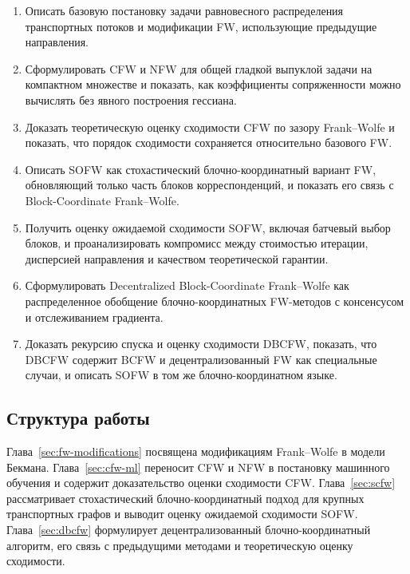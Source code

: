 \begin{enumerate}
    \item Описать базовую постановку задачи равновесного распределения транспортных потоков и модификации FW, использующие предыдущие направления.
    \item Сформулировать CFW и NFW для общей гладкой выпуклой задачи на компактном множестве и показать, как коэффициенты сопряженности можно вычислять без явного построения гессиана.
    \item Доказать теоретическую оценку сходимости CFW по зазору Frank--Wolfe и показать, что порядок сходимости сохраняется относительно базового FW.
    \item Описать SOFW как стохастический блочно-координатный вариант FW, обновляющий только часть блоков корреспонденций, и показать его связь с Block-Coordinate Frank--Wolfe.
    \item Получить оценку ожидаемой сходимости SOFW, включая батчевый выбор блоков, и проанализировать компромисс между стоимостью итерации, дисперсией направления и качеством теоретической гарантии.
    \item Сформулировать Decentralized Block-Coordinate Frank--Wolfe как распределенное обобщение блочно-координатных FW-методов с консенсусом и отслеживанием градиента.
    \item Доказать рекурсию спуска и оценку сходимости DBCFW, показать, что DBCFW содержит BCFW и децентрализованный FW как специальные случаи, и описать SOFW в том же блочно-координатном языке.
\end{enumerate}

\subsection{Структура работы}

Глава~\ref{sec:fw-modifications} посвящена модификациям Frank--Wolfe в модели Бекмана.
Глава~\ref{sec:cfw-ml} переносит CFW и NFW в постановку машинного обучения и содержит
доказательство оценки сходимости CFW.
Глава~\ref{sec:scfw} рассматривает стохастический блочно-координатный подход для крупных
транспортных графов и выводит оценку ожидаемой сходимости SOFW.
Глава~\ref{sec:dbcfw} формулирует децентрализованный блочно-координатный алгоритм, его
связь с предыдущими методами и теоретическую оценку сходимости.
